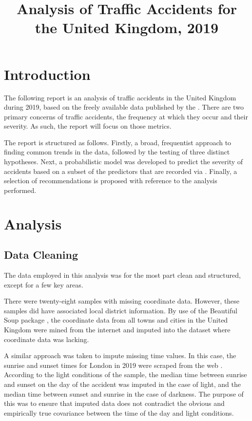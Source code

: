 \documentclass[12pt]{article}
\title{Analysis of Traffic Accidents for the United Kingdom, 2019}
\date{}
\begin{document}
\maketitle



\section{Introduction}

The following report is an analysis of traffic accidents in the United Kingdom during 2019, based on the freely available data published by the \citet{data2019}. There are two primary concerns of traffic accidents, the frequency at which they occur and their severity. As such, the report will focus on those metrics.

The report is structured as follows. Firstly, a broad, frequentist approach to finding common trends in the data, followed by the testing of three distinct hypotheses. Next, a probabilistic model was developed to predict the severity of accidents based on a subset of the predictors that are recorded via \textcite{stats2019}. Finally, a selection of recommendations is proposed with reference to the analysis performed.

\newpage 

\section{Analysis}

\subsection{Data Cleaning}

The data employed in this analysis was for the most part clean and structured, except for a few key areas.

There were twenty-eight samples with missing coordinate data. However, these samples did have associated local district information. By use of the Beautiful Soup package \parencite{bs4}, the coordinate data from all towns and cities in the United Kingdom were mined from the internet \parencite{cities} and imputed into the dataset where coordinate data was lacking.

A similar approach was taken to impute missing time values. In this case, the sunrise and sunset times for London in 2019 were scraped from the web \parencite{sunrise_sunset}. According to the light conditions of the sample, the median time between sunrise and sunset on the day of the accident was imputed in the case of light, and the median time between sunset and sunrise in the case of darkness. The purpose of this was to ensure that imputed data does not contradict the obvious and empirically true covariance between the time of the day and light conditions.
\end{document}
